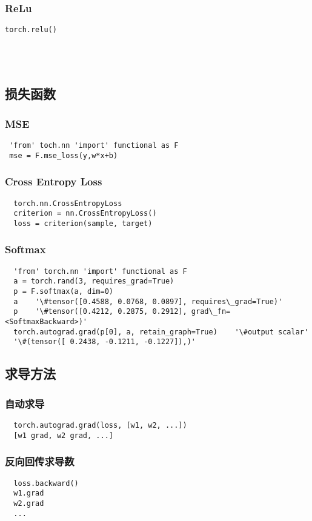 \subsubsection{ReLu}
\begin{lstlisting}
torch.relu()
\end{lstlisting}

~\\
~\\
\subsection{损失函数}
\subsubsection{MSE}
\begin{lstlisting}
 'from' toch.nn 'import' functional as F
 mse = F.mse_loss(y,w*x+b)
\end{lstlisting}

\subsubsection{Cross Entropy Loss}
\begin{lstlisting}
  torch.nn.CrossEntropyLoss
  criterion = nn.CrossEntropyLoss()
  loss = criterion(sample, target)
\end{lstlisting}

\subsubsection{Softmax}
\begin{lstlisting}
  'from' torch.nn 'import' functional as F
  a = torch.rand(3, requires_grad=True)
  p = F.softmax(a, dim=0)
  a    '\#tensor([0.4588, 0.0768, 0.0897], requires\_grad=True)'
  p    '\#tensor([0.4212, 0.2875, 0.2912], grad\_fn=<SoftmaxBackward>)'
  torch.autograd.grad(p[0], a, retain_graph=True)    '\#output scalar'
  '\#(tensor([ 0.2438, -0.1211, -0.1227]),)'
\end{lstlisting}


\subsection{求导方法}
\subsubsection{自动求导}
\begin{lstlisting}
  torch.autograd.grad(loss, [w1, w2, ...])
  [w1 grad, w2 grad, ...]
\end{lstlisting}

\subsubsection{反向回传求导数}
\begin{lstlisting}
  loss.backward()
  w1.grad
  w2.grad
  ...
\end{lstlisting}




